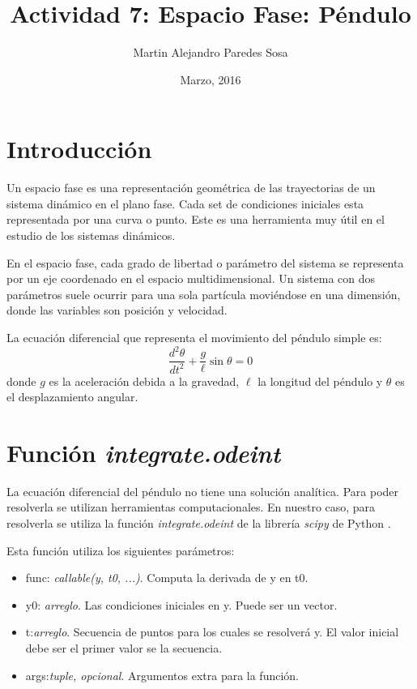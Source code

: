 \documentclass[12pt]{article}
\title{Actividad 7: Espacio Fase: Péndulo}
\author{Martin Alejandro Paredes Sosa}
\date{Marzo, 2016}
\begin{document}
\maketitle

\section{Introducción}
Un espacio fase es una representación geométrica de las trayectorias de un sistema dinámico en el plano fase. Cada set de condiciones iniciales esta representada por una curva o punto. Este es una herramienta muy útil en el estudio de los sistemas dinámicos.

En el espacio fase, cada grado de libertad o parámetro del sistema se representa por un eje coordenado en el espacio multidimensional. Un sistema con dos parámetros suele ocurrir para una sola partícula moviéndose en una dimensión, donde las variables son posición y velocidad.

La ecuación diferencial que representa el movimiento del péndulo simple es:
\begin{equation}\label{Pen}
	\frac{d^2\theta}{dt^2}+\frac{g}{\ell}\sin\theta=0
\end{equation}
donde $g$ es la aceleración debida a la gravedad, $\ell$ la longitud del péndulo y $\theta$ es el desplazamiento angular.


\section{Función \emph{integrate.odeint}}
La ecuación diferencial del péndulo no tiene una solución analítica. Para poder resolverla se utilizan herramientas computacionales. En nuestro caso, para resolverla se utiliza la función \emph{integrate.odeint} de la librería \emph{scipy} de Python \cite{scipy}.

Esta función utiliza los siguientes parámetros:
\begin{itemize}
	\item func: \textit{callable(y, t0, ...)}. Computa la derivada de y en t0.
	\item y0: \textit{arreglo}. Las condiciones iniciales en y. Puede ser un vector.
	\item t:\textit{arreglo}. Secuencia de puntos para los cuales se resolverá y. El valor inicial debe ser el primer valor se la secuencia.
	\item args:\textit{tuple, opcional}. Argumentos extra para la función.
\end{itemize}
\end{document}
